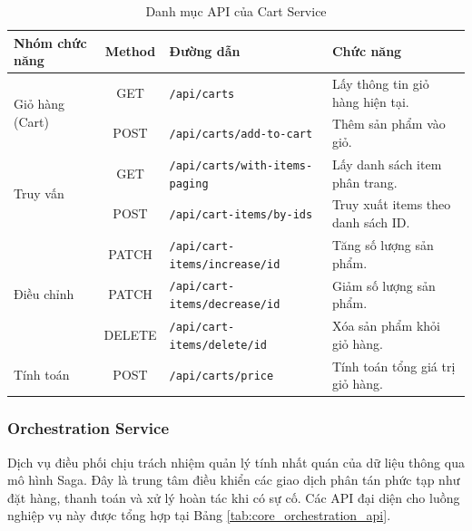 \begin{table}[H]
\centering
\caption{Danh mục API của Cart Service}
\label{tab:all_cart_api}
\begin{tabular}{|l|c|p{5cm}|p{4.5cm}|}
\hline
\textbf{Nhóm chức năng} & \textbf{Method} & \textbf{Đường dẫn} & \textbf{Chức năng} \\ \hline
\multirow{2}{*}{Giỏ hàng (Cart)} & GET & \texttt{/api/carts} & Lấy thông tin giỏ hàng hiện tại. \\ \cline{2-4}
& POST & \texttt{/api/carts/add-to-cart} & Thêm sản phẩm vào giỏ. \\ \hline
\multirow{2}{*}{Truy vấn} & GET & \texttt{/api/carts/with-items-paging} & Lấy danh sách item phân trang. \\ \cline{2-4}
& POST & \texttt{/api/cart-items/by-ids} & Truy xuất items theo danh sách ID. \\ \hline
\multirow{3}{*}{Điều chỉnh} & PATCH & \texttt{/api/cart-items/increase/{id}} & Tăng số lượng sản phẩm. \\ \cline{2-4}
& PATCH & \texttt{/api/cart-items/decrease/{id}} & Giảm số lượng sản phẩm. \\ \cline{2-4}
& DELETE & \texttt{/api/cart-items/delete/{id}} & Xóa sản phẩm khỏi giỏ hàng. \\ \hline
Tính toán & POST & \texttt{/api/carts/price} & Tính toán tổng giá trị giỏ hàng. \\ \hline
\end{tabular}
\end{table}

\subsubsection{Orchestration Service}

Dịch vụ điều phối chịu trách nhiệm quản lý tính nhất quán của dữ liệu thông qua mô hình Saga. Đây là trung tâm điều khiển các giao dịch phân tán phức tạp như đặt hàng, thanh toán và xử lý hoàn tác khi có sự cố. Các API đại diện cho luồng nghiệp vụ này được tổng hợp tại Bảng \ref{tab:core_orchestration_api}.

